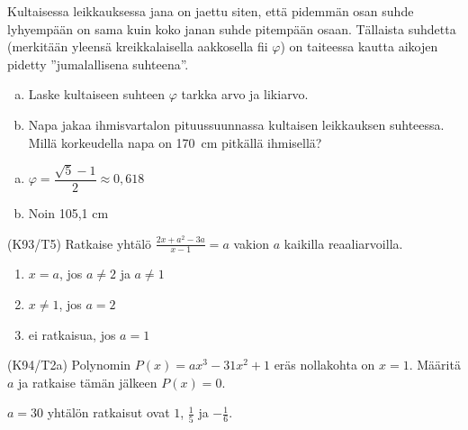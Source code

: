 \begin{tehtava}
    Kultaisessa leikkauksessa jana on jaettu siten, että pidemmän osan suhde lyhyempään on sama kuin koko janan suhde pitempään osaan. Tällaista suhdetta (merkitään yleensä kreikkalaisella aakkosella fii $\varphi$) on taiteessa kautta aikojen pidetty ''jumalallisena suhteena''.
		\begin{enumerate}[a)]
            \item Laske kultaiseen suhteen $\varphi$ tarkka arvo ja likiarvo.
            \item Napa jakaa ihmisvartalon pituussuunnassa kultaisen leikkauksen suhteessa. Millä korkeudella napa on 170~cm pitkällä ihmisellä?
        \end{enumerate}
    \begin{vastaus}
        \begin{enumerate}[a)]
            \item $ \varphi = \dfrac{\sqrt{5}-1}{2} \approx 0,618$
            \item Noin 105,1 cm
        \end{enumerate}
    \end{vastaus}
\end{tehtava}
\begin{tehtava}
(K93/T5) Ratkaise yhtälö 
        $\frac{2x+a^2-3a}{x-1}=a$ vakion $a$ kaikilla reaaliarvoilla.
\begin{vastaus}
        \begin{enumerate}
         \item{$x=a$, jos $a \neq 2$ ja $a \neq 1$} 
         \item{$x\neq 1$, jos $a=2$}
         \item{ei ratkaisua, jos $a=1$}
        \end{enumerate}
    \end{vastaus}
\end{tehtava}
\begin{tehtava}
(K94/T2a) Polynomin $P(x)=ax^3-31x^2+1$ eräs nollakohta on $x=1$. Määritä $a$ ja ratkaise tämän jälkeen $P(x)=0$.
\begin{vastaus}
      $a=30$ yhtälön ratkaisut ovat $1$, $\frac{1}{5}$ ja $-\frac{1}{6}$.
    \end{vastaus}
\end{tehtava}

